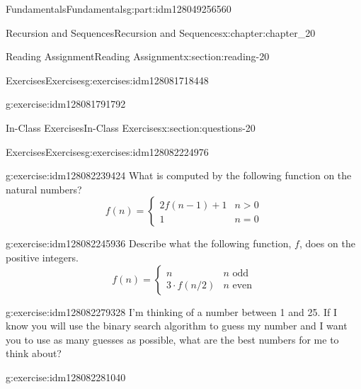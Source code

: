 \documentclass[oneside,10pt,]{book}
\numberwithin{equation}{section}
\newcommand{\gt}{>}
\begin{document}
\begin{partptx}{Fundamentals}{}{Fundamentals}{}{}{g:part:idm128049256560}
\begin{chapterptx}{Recursion and Sequences}{}{Recursion and Sequences}{}{}{x:chapter:chapter_20}
\begin{sectionptx}{Reading Assignment}{}{Reading Assignment}{}{}{x:section:reading-20}
\begin{exercises-subsection}{Exercises}{}{Exercises}{}{}{g:exercises:idm128081718448}
\begin{exercisegroup}
\begin{divisionexerciseeg}{2}{}{}{g:exercise:idm128081791792}
\end{divisionexerciseeg}%
\end{exercisegroup}
\par\medskip\noindent
\end{exercises-subsection}
\end{sectionptx}
%
%
\typeout{************************************************}
\typeout{************************************************}
%
\begin{sectionptx}{In-Class Exercises}{}{In-Class Exercises}{}{}{x:section:questions-20}
%
%
%
\typeout{************************************************}
\typeout{************************************************}
%
\begin{exercises-subsection}{Exercises}{}{Exercises}{}{}{g:exercises:idm128082224976}
\par\medskip\noindent%
%
\begin{exercisegroup}
\begin{divisionexerciseeg}{1}{}{}{g:exercise:idm128082239424}%
What is computed by the following function on the natural numbers?%
\begin{equation*}
f(n)=\begin{cases} 
2 f(n-1)+1 & n \gt 0 \\
1			 & n=0
\end{cases}
\end{equation*}
%
\end{divisionexerciseeg}%
\begin{divisionexerciseeg}{2}{}{}{g:exercise:idm128082245936}%
Describe what the following function, \(f\), does on the positive integers.%
\begin{equation*}
f(n)=\begin{cases} 
n & n\textrm{ odd} \\
3\cdot f(n/2) & n\textrm{ even}
\end{cases}
\end{equation*}
%
\end{divisionexerciseeg}%
\begin{divisionexerciseeg}{3}{}{}{g:exercise:idm128082279328}%
I'm thinking of a number between 1 and 25.  If I know you will use the binary search algorithm to guess my number and I want you to use as many guesses as possible, what are the best numbers for me to think about?%
\end{divisionexerciseeg}%
\begin{divisionexerciseeg}{4}{}{}{g:exercise:idm128082281040}%

\end{divisionexerciseeg}
\end{exercisegroup}
\end{exercises-subsection}
\end{sectionptx}
\end{chapterptx}
\end{partptx}
\end{document}
